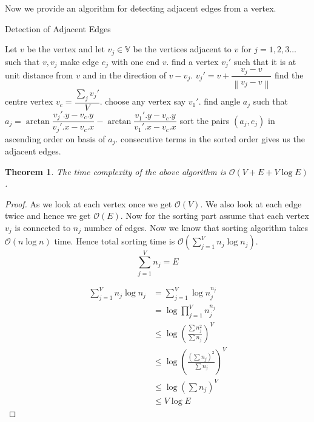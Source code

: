 \documentclass[12pt]{article}
\newtheorem{theorem}{Theorem}
\newcommand{\norm}[1]{\left\lVert#1\right\rVert}
\begin{document}
    Now we provide an algorithm for detecting adjacent edges from a vertex.
    \begin{algorithm}
        \caption{Detection of Adjacent Edges}
        \begin{algorithmic}
            \STATE Let $v$ be the vertex and let $v_j \in \mathbb{V}$ be the vertices adjacent to $v$ for $j=1,2,3\dots$ such that $v,v_j$ make edge $e_j$ with one end $v$.
                \STATE find a vertex $v_{j}'$ such that it is at unit distance from $v$ and in the direction of $v-v_j$.
                \STATE $v_j' = v + \dfrac{v_j-v}{\norm{v_j-v}}$
            \ENDFOR
            \STATE find the centre vertex $v_c = \dfrac{\sum_{j}{v_j'}}{V}$.
            \STATE choose any vertex say $v_1'$.
                \STATE find angle $a_j$ such that $a_j = \arctan{\dfrac{v_j'.y-v_c.y}{v_j'.x-v_c.x}} - \arctan{\dfrac{v_1'.y-v_c.y}{v_1'.x-v_c.x}}$
            \ENDFOR
            \STATE sort the pairs $(a_j,e_j)$ in ascending order on basis of $a_j$.
            \STATE consecutive terms in the sorted order gives us the adjacent edges.
        \end{algorithmic}
    \end{algorithm}
    
    \begin{theorem}The time complexity of the above algorithm is $\mathcal{O}(V+E+V\log{E})$.
    \end{theorem}
    \begin{proof}
        As we look at each vertex once we get $\mathcal{O}(V)$. We also look at each edge twice and hence we get $\mathcal{O}(E)$. Now for the sorting part assume that each vertex $v_j$ is connected to $n_j$ number of edges. Now we know that sorting algorithm takes $\mathcal{O}(n\log{n})$ time. Hence total sorting time is $\mathcal{O}(\sum_{j=1}^{V}{n_j\log{n_j}})$.
        \begin{equation}
            \sum_{j=1}^{V}{n_j} = E
        \end{equation}
        
        \begin{align}
            \sum_{j=1}^{V}{n_j\log{n_j}} & = \sum_{j=1}^{V}{\log{n_j^{n_j}}}\\
            &  = \log{\prod_{j=1}^{V}{n_j^{n_j} }  }\\
            & \leq \log{ {\left(\frac{ \sum{n_j^2}}{\sum{n_j}}\right)}^V}\\
            & \leq \log{ {\left(\frac{ (\sum{n_j})^2}{\sum{n_j}}\right)}^V}\\
            & \leq \log{ {\left(\sum{n_j}\right)}^V}\\
            & \leq V\log{E}
        \end{align}
    \end{proof}
    
\end{document}
